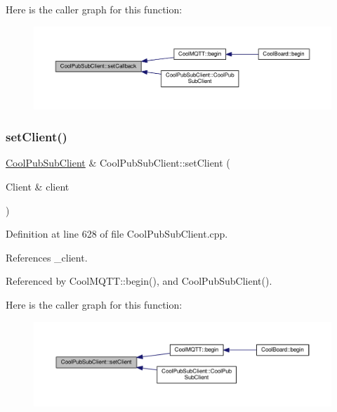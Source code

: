 Here is the caller graph for this function\+:\nopagebreak
\begin{figure}[H]
\begin{center}
\leavevmode
\includegraphics[width=350pt]{d8/d4b/class_cool_pub_sub_client_ac5cab7658f1bdded32131241e468e661_icgraph}
\end{center}
\end{figure}
\mbox{\label{class_cool_pub_sub_client_a7ee119b786010561ab6a9afa0798e91d}} 
\subsubsection{\texorpdfstring{set\+Client()}{setClient()}}
{\footnotesize\ttfamily \hyperlink{class_cool_pub_sub_client}{Cool\+Pub\+Sub\+Client} \& Cool\+Pub\+Sub\+Client\+::set\+Client (\begin{DoxyParamCaption}\item[{Client \&}]{client }\end{DoxyParamCaption})}



Definition at line 628 of file Cool\+Pub\+Sub\+Client.\+cpp.



References \+\_\+client.



Referenced by Cool\+M\+Q\+T\+T\+::begin(), and Cool\+Pub\+Sub\+Client().

Here is the caller graph for this function\+:\nopagebreak
\begin{figure}[H]
\begin{center}
\leavevmode
\includegraphics[width=350pt]{d8/d4b/class_cool_pub_sub_client_a7ee119b786010561ab6a9afa0798e91d_icgraph}
\end{center}
\end{figure}
\mbox{\label{class_cool_pub_sub_client_ae97e40823ea689ff9e36d5bdd71bb933}} 
